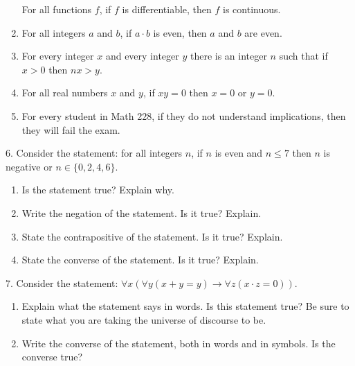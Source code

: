 \documentclass[10pt,]{book}
\theoremstyle{plain}
\theoremstyle{definition}
\numberwithin{equation}{chapter}
\def\imp{\rightarrow}
\begin{document}
\begin{exerciselist}
\begin{enumerate}[label=(\alph*)]
            For all functions \(f\), if \(f\) is differentiable, then \(f\) is continuous.
\item\hypertarget{li-708}{}
            For all integers \(a\) and \(b\), if \(a\cdot b\) is even, then \(a\) and \(b\) are even.
\item\hypertarget{li-709}{}
            For every integer \(x\) and every integer \(y\) there is an integer \(n\) such that if \(x > 0\) then \(nx > y\).
\item\hypertarget{li-710}{}
            For all real numbers \(x\) and \(y\), if \(xy = 0\) then \(x = 0\) or \(y = 0\).
\item\hypertarget{li-711}{}
            For every student in Math 228, if they do not understand implications, then they will fail the exam.
\end{enumerate}
\par\smallskip
\item[6.]\hypertarget{exercise-267}{}
        Consider the statement: for all integers \(n\), if \(n\) is even and \(n \le 7\) then \(n\) is negative or \(n \in \{0,2,4,6\}\).
\leavevmode%
\begin{enumerate}[label=(\alph*)]
\item\hypertarget{li-721}{}
            Is the statement true? Explain why.
\item\hypertarget{li-722}{}
            Write the negation of the statement. Is it true? Explain.
\item\hypertarget{li-723}{}
            State the contrapositive of the statement. Is it true? Explain.
\item\hypertarget{li-724}{}
            State the converse of the statement. Is it true? Explain.
\end{enumerate}
\par\smallskip
\item[7.]\hypertarget{exercise-268}{}
        Consider the statement: \(\forall x (\forall y (x + y = y) \imp \forall z (x\cdot z = 0))\).
\leavevmode%
\begin{enumerate}[label=(\alph*)]
\item\hypertarget{li-729}{}
            Explain what the statement says in words. Is this statement true? Be sure to state what you are taking the universe of discourse to be.
\item\hypertarget{li-730}{}
            Write the converse of the statement, both in words and in symbols. Is the converse true?

\end{enumerate}
\end{exerciselist}
\end{document}

